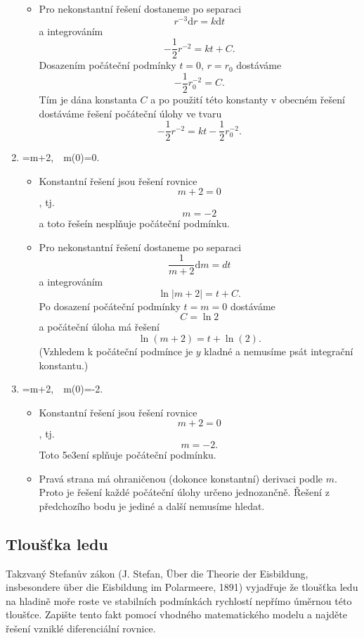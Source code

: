 \begin{enumerate}[(1)]
\begin{itemize}
  \item Pro nekonstantní řešení dostaneme po separaci  $$ r^{-3}\mathrm dr=k\mathrm dt $$ a integrováním $$ -\frac 12 r^{-2}=kt+C.$$ Dosazením počáteční podmínky $t=0$, $r=r_0$ dostáváme $$ -\frac 12 r_0^{-2}=C.$$ Tím je dána konstanta $C$ a po použití této konstanty v obecném řešení dostáváme řešení počáteční úlohy ve tvaru $$ -\frac 12 r^{-2}=kt-\frac 12 r_0^{-2}.$$
  \end{itemize}
\item \priklad {}=m+2,\ \ m(0)=0.
  \begin{itemize}
  \item Konstantní řešení jsou řešení rovnice $$ m+2=0$$, tj. $$ m=-2$$ a toto řešeín nesplňuje počáteční podmínku.
  \item Pro nekonstantní řešení dostaneme po separaci  $$ \frac1{m+2}\mathrm dm=dt $$ a integrováním $$ \ln|m+2|=t+C.$$ Po dosazení počáteční podmínky $t=m=0$ dostáváme $$C=\ln 2$$ a počáteční úloha má řešení $$\ln(m+2)=t+\ln (2).$$ (Vzhledem k počáteční podmínce je $y$ kladné a nemusíme psát integrační konstantu.)
  \end{itemize}
\item \priklad {}=m+2,\ \ m(0)=-2.
  \begin{itemize}
  \item Konstantní řešení jsou řešení rovnice $$ m+2=0$$, tj. $$ m=-2.$$ Toto 5e3ení splňuje počáteční podmínku.
  \item Pravá strana má ohraničenou (dokonce konstantní) derivaci podle $m$. Proto je řešení každé počáteční úlohy určeno jednozančně. Řešení z předchozího bodu je jediné a další nemusíme hledat.
  \end{itemize}
\end{enumerate}

\konec

\subsection{Tloušťka ledu}

Takzvaný Stefanův zákon (J. Stefan, \"Uber die Theorie der Eisbildung, insbesondere \"uber die Eisbildung im Polarmeere, 1891) vyjadřuje že tloušťka ledu na hladině moře roste ve
stabilních podmínkách rychlostí nepřímo úměrnou této tloušťce. Zapište
tento fakt pomocí vhodného matematického modelu a najděte řešení
vzniklé diferenciální rovnice.

\reseni


